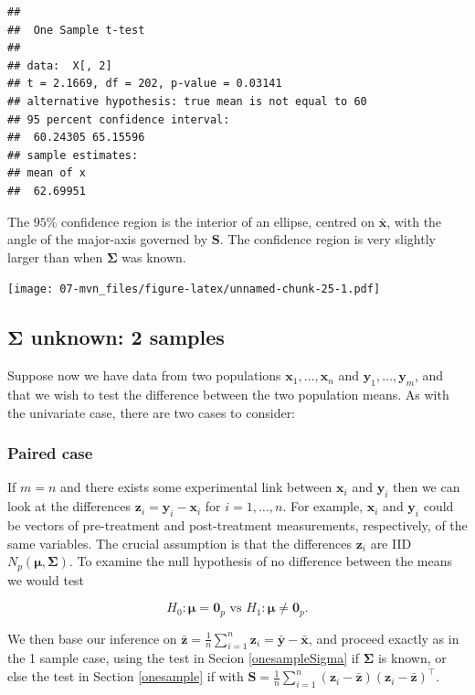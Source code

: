 \documentclass[
]{book}
\theoremstyle{definition}
\theoremstyle{definition}
\theoremstyle{definition}
\theoremstyle{definition}
\theoremstyle{remark}
\begin{document}
\begin{verbatim}
## 
##  One Sample t-test
## 
## data:  X[, 2]
## t = 2.1669, df = 202, p-value = 0.03141
## alternative hypothesis: true mean is not equal to 60
## 95 percent confidence interval:
##  60.24305 65.15596
## sample estimates:
## mean of x 
##  62.69951
\end{verbatim}

The \(95\)\% confidence region is the interior of an ellipse, centred on \(\bar{\mathbf x}\), with the angle of the major-axis governed by \(\mathbf S\). The confidence region is very slightly larger than when \(\boldsymbol{\Sigma}\) was known.

\texttt{[image: 07-mvn\_files/figure-latex/unnamed-chunk-25-1.pdf]}

\subsection{\texorpdfstring{\(\boldsymbol{\Sigma}\) unknown: 2 samples}{\textbackslash boldsymbol\{\textbackslash Sigma\} unknown: 2 samples}}\label{boldsymbolsigma-unknown-2-samples}

Suppose now we have data from two populations \(\mathbf x_1, \ldots, \mathbf x_n\) and \(\mathbf y_1,\ldots, \mathbf y_m\), and that we wish to test the difference between the two population means. As with the univariate case, there are two cases to consider:

\subsubsection*{Paired case}\label{paired-case}

If \(m=n\) and there exists some experimental link between \(\mathbf x_i\) and \(\mathbf y_i\) then we can look at the differences \(\mathbf z_i = \mathbf y_i - \mathbf x_i\) for \(i=1,\ldots,n\). For example, \(\mathbf x_i\) and \(\mathbf y_i\) could be vectors of pre-treatment and post-treatment measurements, respectively, of the same variables. The crucial assumption is that the differences \(\mathbf z_i\) are IID \(N_p({\boldsymbol{\mu}}, \boldsymbol{\Sigma})\). To examine the null hypothesis of no difference between the means we would test

\[H_0: {\boldsymbol{\mu}}={\mathbf 0}_p \mbox{ vs } H_1: {\boldsymbol{\mu}}\neq {\mathbf 0}_p.\]

We then base our inference on \(\bar{\mathbf z} = \frac{1}{n} \sum_{i=1}^n \mathbf z_i = \bar{\mathbf y} - \bar{\mathbf x}\), and proceed exactly as in the 1 sample case, using the test in Secion \ref{onesampleSigma} if \(\boldsymbol{\Sigma}\) is known, or else the test in Section \ref{onesample} if with \(\mathbf S= \frac{1}{n} \sum_{i=1}^n (\mathbf z_i - \bar{\mathbf z})(\mathbf z_i - \bar{\mathbf z})^\top\).
\end{document}
